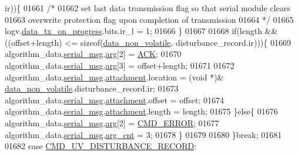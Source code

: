 \begin{DoxyCode}
{{{{{      ir))\{
01661                         \textcolor{comment}{/*}
01662 \textcolor{comment}{                         set last data transmission flag so that serial module clears}
01663 \textcolor{comment}{                         overwrite protection flag upon completion of transmission}
01664 \textcolor{comment}{                       */}
01665                         logv.\hyperlink{a00021_a6cdefde69642ef511e3252c38be68516}{data\_tx\_on\_progress}.bits.ir\_l = 1;
01666                     \}
01667 
01668                    \textcolor{keywordflow}{if}(length &&((offset+length) <= \textcolor{keyword}{sizeof}(\hyperlink{a00060_a76ac5f917f5308dcd83de0d7c94559fb}{data\_non\_volatile}.
      disturbance\_record.ir)))\{
01669                        algorithm\_data.\hyperlink{a00016_afcf5f557aea688aad985eec15269c1da}{serial\_msg}.\hyperlink{a00031_af7d6f762438c80072bd9dc0e4dd4ae1e}{arg}[2]                 = 
      \hyperlink{a00021_a6f6489887e08bff4887d0bc5dcf214d8}{ACK};
01670                        algorithm\_data.\hyperlink{a00016_afcf5f557aea688aad985eec15269c1da}{serial\_msg}.\hyperlink{a00031_af7d6f762438c80072bd9dc0e4dd4ae1e}{arg}[3]                 = offset+length;
01671 
01672                        algorithm\_data.\hyperlink{a00016_afcf5f557aea688aad985eec15269c1da}{serial\_msg}.\hyperlink{a00031_a040f6d5d58d18d8aeaf447eda7f50172}{attachment}.location    = (\textcolor{keywordtype}{void} *)&
      \hyperlink{a00060_a76ac5f917f5308dcd83de0d7c94559fb}{data\_non\_volatile}.disturbance\_record.ir;
01673                        algorithm\_data.\hyperlink{a00016_afcf5f557aea688aad985eec15269c1da}{serial\_msg}.\hyperlink{a00031_a040f6d5d58d18d8aeaf447eda7f50172}{attachment}.offset      = offset;
01674                        algorithm\_data.\hyperlink{a00016_afcf5f557aea688aad985eec15269c1da}{serial\_msg}.\hyperlink{a00031_a040f6d5d58d18d8aeaf447eda7f50172}{attachment}.length      = length;
01675                      \}\textcolor{keywordflow}{else}\{
01676                          algorithm\_data.\hyperlink{a00016_afcf5f557aea688aad985eec15269c1da}{serial\_msg}.\hyperlink{a00031_af7d6f762438c80072bd9dc0e4dd4ae1e}{arg}[2]               = 
      \hyperlink{a00021_a1764a522e9c1a59a59be8757c69fa494}{CMD\_ERROR};
01677                          algorithm\_data.\hyperlink{a00016_afcf5f557aea688aad985eec15269c1da}{serial\_msg}.\hyperlink{a00031_a7b79f40e2eeec288091afd340bf8f591}{arg\_cnt}              = 3;
01678                      \}
01679 
01680                 \}\textcolor{keywordflow}{break};
01681 
01682                  \textcolor{keywordflow}{case}  \hyperlink{a00021_ae45bb46748497c6a117beb1e93072d83}{CMD\_UV\_DISTURBANCE\_RECORD}:
}}}}}
\end{DoxyCode}
